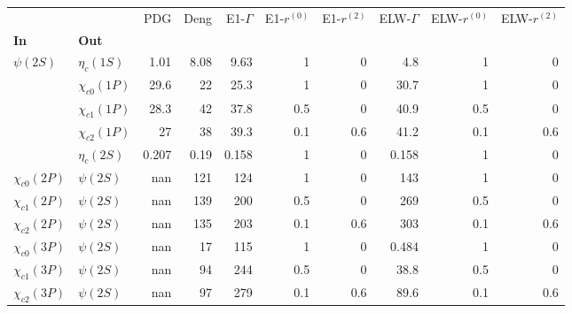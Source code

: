 \begin{tabular}{l|l|r|r|r|r|r|r|r|r}
\toprule
                &            &   PDG &  Deng &  E1-$\Gamma$ &  E1-$r^{(0)}$ &  E1-$r^{(2)}$ &  ELW-$\Gamma$ &  ELW-$r^{(0)}$ &  ELW-$r^{(2)}$ \\
\textbf{In} & \textbf{Out} &       &       &              &               &               &               &                &                \\
\midrule
\textbf{$\psi(2S)$} & \textbf{$\eta_{c}(1S)$} &  1.01 &  8.08 &         9.63 &             1 &             0 &           4.8 &              1 &              0 \\
                & \textbf{$\chi_{c0}(1P)$} &  29.6 &    22 &         25.3 &             1 &             0 &          30.7 &              1 &              0 \\
                & \textbf{$\chi_{c1}(1P)$} &  28.3 &    42 &         37.8 &           0.5 &             0 &          40.9 &            0.5 &              0 \\
                & \textbf{$\chi_{c2}(1P)$} &    27 &    38 &         39.3 &           0.1 &           0.6 &          41.2 &            0.1 &            0.6 \\
                & \textbf{$\eta_{c}(2S)$} & 0.207 &  0.19 &        0.158 &             1 &             0 &         0.158 &              1 &              0 \\
\textbf{$\chi_{c0}(2P)$} & \textbf{$\psi(2S)$} &   nan &   121 &          124 &             1 &             0 &           143 &              1 &              0 \\
\textbf{$\chi_{c1}(2P)$} & \textbf{$\psi(2S)$} &   nan &   139 &          200 &           0.5 &             0 &           269 &            0.5 &              0 \\
\textbf{$\chi_{c2}(2P)$} & \textbf{$\psi(2S)$} &   nan &   135 &          203 &           0.1 &           0.6 &           303 &            0.1 &            0.6 \\
\textbf{$\chi_{c0}(3P)$} & \textbf{$\psi(2S)$} &   nan &    17 &          115 &             1 &             0 &         0.484 &              1 &              0 \\
\textbf{$\chi_{c1}(3P)$} & \textbf{$\psi(2S)$} &   nan &    94 &          244 &           0.5 &             0 &          38.8 &            0.5 &              0 \\
\textbf{$\chi_{c2}(3P)$} & \textbf{$\psi(2S)$} &   nan &    97 &          279 &           0.1 &           0.6 &          89.6 &            0.1 &            0.6 \\
\bottomrule
\end{tabular}
